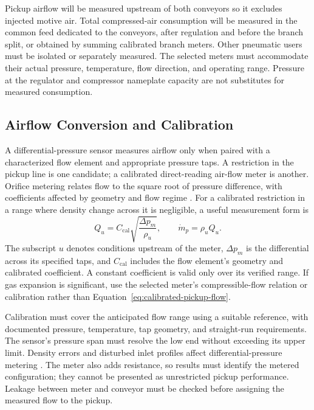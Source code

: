 Pickup airflow will be measured upstream of both conveyors so it excludes injected motive air. Total compressed-air consumption will be measured in the common feed dedicated to the conveyors, after regulation and before the branch split, or obtained by summing calibrated branch meters. Other pneumatic users must be isolated or separately measured. The selected meters must accommodate their actual pressure, temperature, flow direction, and operating range. Pressure at the regulator and compressor nameplate capacity are not substitutes for measured consumption.

\subsection{Airflow Conversion and Calibration}
A differential-pressure sensor measures airflow only when paired with a characterized flow element and appropriate pressure taps. A restriction in the pickup line is one candidate; a calibrated direct-reading air-flow meter is another. Orifice metering relates flow to the square root of pressure difference, with coefficients affected by geometry and flow regime \citep{dwyerDifferentialFlow}. For a calibrated restriction in a range where density change across it is negligible, a useful measurement form is
\begin{equation}
 Q_u=C_{\mathrm{cal}}\sqrt{\frac{\Delta p_m}{\rho_u}},
 \qquad \dot m_p=\rho_u Q_u.
 \label{eq:calibrated-pickup-flow}
\end{equation}
The subscript $u$ denotes conditions upstream of the meter, $\Delta p_m$ is the differential across its specified taps, and $C_{\mathrm{cal}}$ includes the flow element's geometry and calibrated coefficient. A constant coefficient is valid only over its verified range. If gas expansion is significant, use the selected meter's compressible-flow relation or calibration rather than Equation~\ref{eq:calibrated-pickup-flow}.

Calibration must cover the anticipated flow range using a suitable reference, with documented pressure, temperature, tap geometry, and straight-run requirements. The sensor's pressure span must resolve the low end without exceeding its upper limit. Density errors and disturbed inlet profiles affect differential-pressure metering \citep{dwyerDifferentialFlow}. The meter also adds resistance, so results must identify the metered configuration; they cannot be presented as unrestricted pickup performance. Leakage between meter and conveyor must be checked before assigning the measured flow to the pickup.

